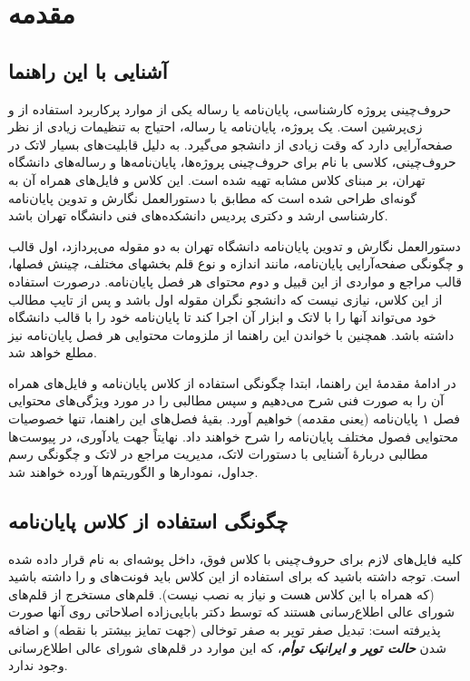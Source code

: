 
\chapter{مقدمه}
\thispagestyle{empty}
\section{آشنایی با این راهنما}
حروف‌چینی پروژه کارشناسی، پایان‌نامه یا رساله یکی از موارد پرکاربرد استفاده از
\lr{\LaTeX}
و زی‌پرشین
\cite{Khalighi87xepersian}
است. یک پروژه، پایان‌نامه یا رساله، احتیاج به تنظیمات زیادی از نظر صفحه‌آرایی دارد که وقت زیادی از دانشجو می‌گیرد. به دلیل قابلیت‌های بسیار لاتک در حروف‌چینی، کلاسی با نام 
برای حروف‌چینی پروژه‌ها، پایان‌نامه‌ها و رساله‌های دانشگاه تهران، بر مبنای کلاس مشابه
تهیه شده است. این کلاس و فایل‌های همراه آن به گونه‌ای طراحی شده است که مطابق با دستورالعمل نگارش و تدوین پایان‌نامه کارشناسی ارشد و دکتری پردیس دانشکده‌های فنی دانشگاه تهران
\cite{UTThesisGuide}
باشد.

دستورالعمل نگارش و تدوین پایان‌نامه دانشگاه تهران به دو مقوله می‌پردازد، اول قالب و چگونگی صفحه‌آرایی پایان‌نامه، مانند اندازه و نوع قلم بخشهای مختلف، چینش فصلها، قالب مراجع و مواردی از این قبیل و دوم محتوای هر فصل پایان‌نامه. 
درصورت استفاده از این کلاس، نیازی نیست که دانشجو نگران مقوله اول باشد و پس از تایپ مطالب خود می‌تواند آنها را با لاتک و ابزار آن اجرا کند تا پایان‌نامه خود را با قالب دانشگاه داشته باشد. همچنین با خواندن این راهنما از ملزومات محتوایی هر فصل پایان‌نامه نیز مطلع خواهد شد.

در ادامهٔ  مقدمهٔ این راهنما، ابتدا چگونگی استفاده از کلاس پایان‌نامه و فایل‌های همراه آن را به صورت فنی شرح می‌دهیم و سپس مطالبی را در مورد ویژگی‌های محتوایی فصل ۱ پایان‌نامه (یعنی مقدمه) خواهیم آورد.
بقیهٔ فصل‌های این راهنما، تنها خصوصیات محتوایی فصول مختلف پایان‌نامه را شرح خواهند داد. نهایتاً جهت یادآوری، در پیوست‌ها مطالبی دربارهٔ آشنایی با دستورات لاتک، مدیریت مراجع در لاتک و چگونگی رسم جداول، نمودارها و الگوریتم‌ها آورده خواهند شد.

\section{چگونگی استفاده از کلاس پایان‌نامه}
کلیه فایل‌های لازم برای حروف‌چینی با کلاس فوق، داخل پوشه‌ای به نام
قرار داده شده است. توجه داشته باشید که برای استفاده از این کلاس باید فونت‌های
و
را داشته باشید (که همراه با این کلاس هست و نیاز به نصب نیست).
قلم‌های
مستخرج از قلم‌های
شورای عالی اطلاع‌رسانی هستند که توسط دکتر بابایی‌زاده اصلاحاتی روی آنها صورت پذیرفته است: تبدیل صفر توپر به صفر توخالی (جهت تمایز بیشتر با نقطه) و اضافه شدن
\textit{\textbf{حالت توپر و ایرانیک توأم}}،
که این موارد در قلم‌های شورای عالی اطلاع‌رسانی وجود ندارد.

